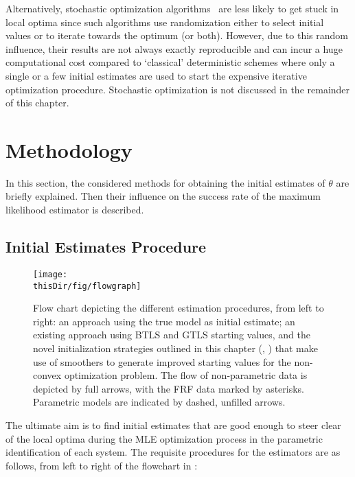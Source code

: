 \begin{remark}
Alternatively, stochastic optimization algorithms~\citep{Spall2012,Press2007} are less likely to get stuck in local optima since such algorithms use randomization either to select initial values or to iterate towards the optimum (or both).
However, due to this random influence, their results are not always exactly reproducible and can incur a huge computational cost compared to `classical' deterministic schemes where only a single or a few initial estimates are used to start the expensive iterative optimization procedure.
Stochastic optimization is not discussed in the remainder of this chapter.
\end{remark}

\section{Methodology}\label{se:MethodEg}
In this section, the considered methods for obtaining the initial estimates of $\theta$ are briefly explained. Then their influence on the success rate of the maximum likelihood estimator is described.

\subsection{Initial Estimates Procedure}\label{sec:init:procedures}
\begin{figure}[p]
  \centering
  \texttt{[image: \\thisDir/fig/flowgraph]}
  \caption[Flow chart of different initialization procedures.]{Flow chart depicting the different estimation procedures, from left to right:  an approach using the true model as initial estimate;  an existing approach using \gls{BTLS} and \gls{GTLS} starting values, and the novel initialization strategies outlined in this chapter (, ) that make use of smoothers to generate improved starting values for the non-convex optimization problem.
  The flow of non-parametric data is depicted by full arrows, with the \gls{FRF} data marked by asterisks. Parametric models are indicated by dashed, unfilled arrows.} 
  \label{fig:flowgraph}
\end{figure}

The ultimate aim is to find initial estimates that are good enough to steer clear of the local optima during the \gls{MLE} optimization process in the parametric identification of each system. 
The requisite procedures for the estimators are as follows, from left to right of the flowchart in :

